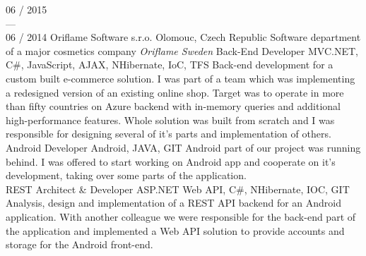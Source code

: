\documentclass[]{friggeri-cv} %
\begin{document}
\begin{entrylist}
        \job
        {06 / 2015 \\ --- \\ 06 / 2014}
        {Oriflame Software s.r.o.}
        {Olomouc, Czech Republic}
        {Software department of a major cosmetics company \emph{Oriflame Sweden}}
        {
            \position
            {Back-End Developer}
            {MVC.NET, C\#, JavaScript, AJAX, NHibernate, IoC, TFS}
            {Back-end development for a custom built e-commerce solution.
            I was part of a team which was implementing a redesigned version of an existing online shop.
            Target was to operate in more than fifty countries on Azure backend with in-memory queries and additional high-performance features.
            Whole solution was built from scratch and I was responsible for designing several of it's parts and implementation of others.}\\
            \position
            {Android Developer}
            {Android, JAVA, GIT}
            {Android part of our project was running behind.
            I was offered to start working on Android app and cooperate on it's development, taking over some parts of the application.}\\
            \position
            {REST Architect \& Developer}
            {ASP.NET Web API, C\#, NHibernate, IOC, GIT}
            {Analysis, design and implementation of a REST API backend for an Android application.
            With another colleague we were responsible for the back-end part of the application and implemented a Web API solution to provide
            accounts and storage for the Android front-end.}%
        }
    \end{entrylist}
\end{document}
